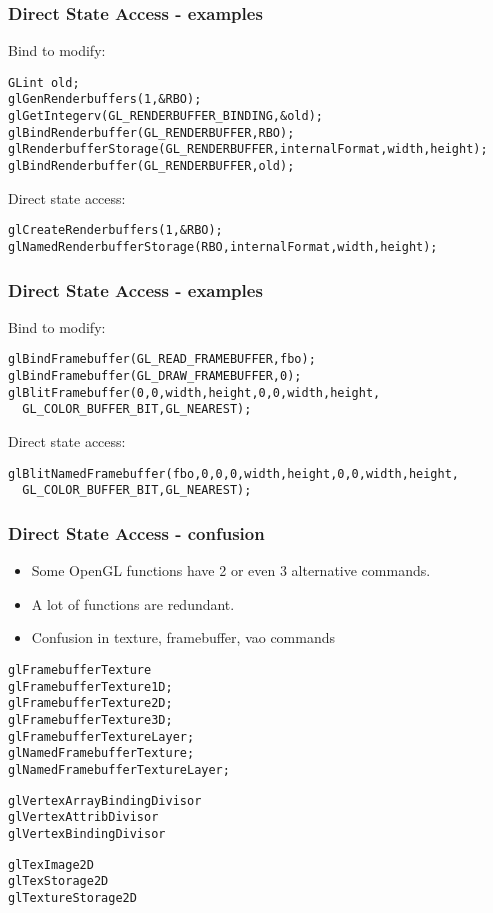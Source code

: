 \begin{frame}[fragile]
  \frametitle{Direct State Access - examples}
    Bind to modify:
{\scriptsize
\begin{verbatim}
GLint old;
glGenRenderbuffers(1,&RBO);
glGetIntegerv(GL_RENDERBUFFER_BINDING,&old);
glBindRenderbuffer(GL_RENDERBUFFER,RBO);
glRenderbufferStorage(GL_RENDERBUFFER,internalFormat,width,height);
glBindRenderbuffer(GL_RENDERBUFFER,old);
\end{verbatim}
}
    Direct state access:
{\scriptsize
\begin{verbatim}
glCreateRenderbuffers(1,&RBO);
glNamedRenderbufferStorage(RBO,internalFormat,width,height);
\end{verbatim}
}
\end{frame}

\begin{frame}[fragile]
  \frametitle{Direct State Access - examples}
    Bind to modify:
{\scriptsize
\begin{verbatim}
glBindFramebuffer(GL_READ_FRAMEBUFFER,fbo);
glBindFramebuffer(GL_DRAW_FRAMEBUFFER,0);
glBlitFramebuffer(0,0,width,height,0,0,width,height,
  GL_COLOR_BUFFER_BIT,GL_NEAREST);
\end{verbatim}
}
    Direct state access:
{\scriptsize
\begin{verbatim}
glBlitNamedFramebuffer(fbo,0,0,0,width,height,0,0,width,height,
  GL_COLOR_BUFFER_BIT,GL_NEAREST);
\end{verbatim}
}
\end{frame}

\begin{frame}[fragile]
  \frametitle{Direct State Access - confusion}
  \begin{itemize}
    \item Some OpenGL functions have 2 or even 3 alternative commands.
    \item A lot of functions are redundant.
    \item Confusion in texture, framebuffer, vao commands
  \end{itemize}
{\tiny
\begin{verbatim}
glFramebufferTexture
glFramebufferTexture1D;
glFramebufferTexture2D;
glFramebufferTexture3D;
glFramebufferTextureLayer;
glNamedFramebufferTexture;
glNamedFramebufferTextureLayer;
\end{verbatim}
}
{\tiny
\begin{verbatim}
glVertexArrayBindingDivisor
glVertexAttribDivisor
glVertexBindingDivisor
\end{verbatim}
}
{\tiny
\begin{verbatim}
glTexImage2D
glTexStorage2D
glTextureStorage2D
\end{verbatim}
}
\end{frame}

